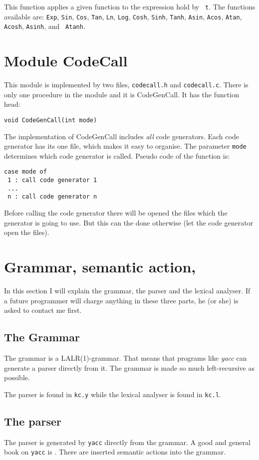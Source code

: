 This function applies a given function to the expression hold by {\tt
  t}. The functions available are: {\tt Exp}, {\tt Sin}, {\tt Cos},
{\tt Tan}, {\tt Ln}, {\tt Log}, {\tt Cosh}, {\tt Sinh}, {\tt Tanh},
{\tt Asin}, {\tt Acos}, {\tt Atan}, {\tt Acosh}, {\tt Asinh}, and {\tt
  Atanh}. 

\newpage
\section{Module CodeCall}
This module is implemented by two files, {\tt codecall.h} and 
{\tt codecall.c}. There is only one procedure
in the module and it is CodeGenCall. It has the function head:
\begin{verbatim}
void CodeGenCall(int mode)
\end{verbatim}

The implementation of CodeGenCall includes {\em all} code generators. 
Each code generator has its one
file, which makes it easy to organise. The parameter {\tt mode} 
determines which code generator is
called. Pseudo code of the function is:
\begin{verbatim}
case mode of
 1 : call code generator 1
 ...
 n : call code generator n
\end{verbatim}

Before calling the code generator there will be opened the files 
which the generator is going to use. But this can the done otherwise 
(let the code generator open the files).

\newpage
\section{Grammar, semantic action, \etc}
In this section I will explain the grammar, the parser and the lexical
analyser. If a future programmer will charge anything in these three
parts, he (or she) is asked to contact me first. 

\subsection{The Grammar}
The grammar is a LALR(1)-grammar. That means that programs like {\em yacc} can 
generate a parser directly from it. The grammar is made so much 
left-recursive as possible. 

The parser is found in {\tt kc.y} while the lexical analyser is found
in {\tt kc.l}.

\subsection{The parser}
The parser is generated by {\tt yacc} directly from the grammar. A
good and general book on {\tt yacc} is \cite{LexYacc}.
There are inserted semantic actions into the grammar. 

